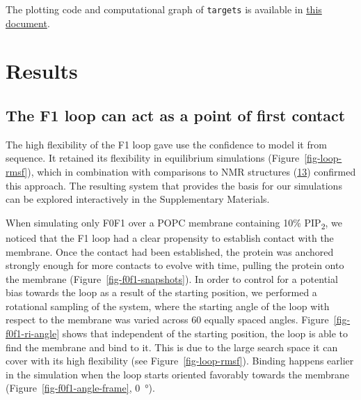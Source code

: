 \documentclass[
  twocolumn]{biophys-new-mod}
\begin{document}
The plotting code and computational graph of \texttt{targets} is
available in \href{./_analysis.html}{this document}.

\hypertarget{results}{%
\section{Results}\label{results}}

\hypertarget{the-f1-loop-can-act-as-a-point-of-first-contact}{%
\subsection{The F1 loop can act as a point of first
contact}\label{the-f1-loop-can-act-as-a-point-of-first-contact}}

The high flexibility of the F1 loop gave use the confidence to model it
from sequence. It retained its flexibility in equilibrium simulations
(Figure~\ref{fig-loop-rmsf}), which in combination with comparisons to
NMR structures
(\protect\hyperlink{ref-goultStructureDoubleUbiquitinlike2010}{13})
confirmed this approach. The resulting system that provides the basis
for our simulations can be explored interactively in the Supplementary
Materials.

When simulating only F0F1 over a POPC membrane containing 10\%
PIP\textsubscript{2}, we noticed that the F1 loop had a clear propensity
to establish contact with the membrane. Once the contact had been
established, the protein was anchored strongly enough for more contacts
to evolve with time, pulling the protein onto the membrane
(Figure~\ref{fig-f0f1-snapshots}). In order to control for a potential
bias towards the loop as a result of the starting position, we performed
a rotational sampling of the system, where the starting angle of the
loop with respect to the membrane was varied across 60 equally spaced
angles. Figure~\ref{fig-f0f1-ri-angle} shows that independent of the
starting position, the loop is able to find the membrane and bind to it.
This is due to the large search space it can cover with its high
flexibility (see Figure~\ref{fig-loop-rmsf}). Binding happens earlier in
the simulation when the loop starts oriented favorably towards the
membrane (Figure~\ref{fig-f0f1-angle-frame}, 0~°).
\end{document}
